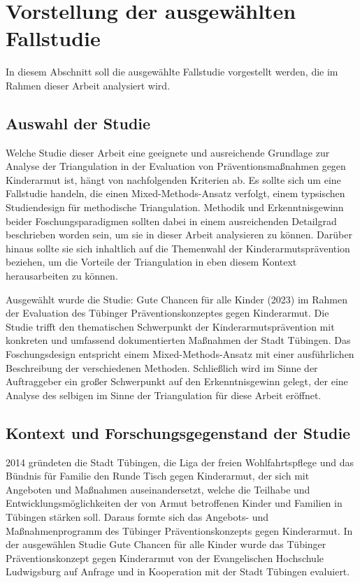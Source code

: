 \section{Vorstellung der ausgewählten Fallstudie}

In diesem Abschnitt soll die ausgewählte Fallstudie vorgestellt werden, die im Rahmen dieser Arbeit analysiert wird.

\subsection{Auswahl der Studie}

Welche Studie dieser Arbeit eine geeignete und ausreichende Grundlage zur Analyse der Triangulation in der Evaluation von Präventionsmaßnahmen gegen Kinderarmut ist, hängt von nachfolgenden Kriterien ab. Es sollte sich um eine Fallstudie handeln, die einen Mixed-Methods-Ansatz verfolgt, einem typsischen Studiendesign für methodische Triangulation. Methodik und Erkenntnisgewinn beider Foschungsparadigmen sollten dabei in einem ausreichenden Detailgrad beschrieben worden sein, um sie in dieser Arbeit analysieren zu können. Darüber hinaus sollte sie sich inhaltlich auf die Themenwahl der Kinderarmutsprävention beziehen, um die Vorteile der Triangulation in eben diesem Kontext herausarbeiten zu können.

Ausgewählt wurde die Studie: Gute Chancen für alle Kinder (2023) im Rahmen der Evaluation des Tübinger Präventionskonzeptes gegen Kinderarmut. Die Studie trifft den thematischen Schwerpunkt der Kinderarmutsprävention mit konkreten und umfassend dokumentierten Maßnahmen der Stadt Tübingen. Das Foschungsdesign entspricht einem Mixed-Methods-Ansatz mit einer ausführlichen Beschreibung der verschiedenen Methoden. Schließlich wird im Sinne der Auftraggeber ein großer Schwerpunkt auf den Erkenntnisgewinn gelegt, der eine Analyse des selbigen im Sinne der Triangulation für diese Arbeit eröffnet.

\subsection{Kontext und Forschungsgegenstand der Studie}

2014 gründeten die Stadt Tübingen, die Liga der freien Wohlfahrtspflege und das Bündnis für Familie den Runde Tisch gegen Kinderarmut, der sich mit Angeboten und Maßnahmen auseinandersetzt, welche die Teilhabe und Entwicklungsmöglichkeiten der von Armut betroffenen Kinder und Familien in Tübingen stärken soll. Daraus formte sich das Angebots- und Maßnahmenprogramm des Tübinger Präventionskonzepts gegen Kinderarmut. In der ausgewählen Studie Gute Chancen für alle Kinder wurde das Tübinger Präventionskonzept gegen Kinderarmut von der Evangelischen Hochschule Ludwigsburg auf Anfrage und in Kooperation mit der Stadt Tübingen evaluiert.

